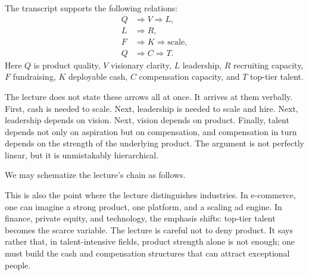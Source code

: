 The transcript supports the following relations:
\begin{align}
Q &\Rightarrow V \Rightarrow L,\\
L &\Rightarrow R,\\
F &\Rightarrow K \Rightarrow \text{scale},\\
Q &\Rightarrow C \Rightarrow T.
\end{align}
Here $Q$ is product quality, $V$ visionary clarity, $L$ leadership, $R$ recruiting capacity, $F$ fundraising, $K$ deployable cash, $C$ compensation capacity, and $T$ top-tier talent.

The lecture does not state these arrows all at once. It arrives at them verbally. First, cash is needed to scale. Next, leadership is needed to scale and hire. Next, leadership depends on vision. Next, vision depends on product. Finally, talent depends not only on aspiration but on compensation, and compensation in turn depends on the strength of the underlying product. The argument is not perfectly linear, but it is unmistakably hierarchical.

We may schematize the lecture's chain as follows.

\begin{figure}
\centering
{}
\end{figure}

This is also the point where the lecture distinguishes industries. In e-commerce, one can imagine a strong product, one platform, and a scaling ad engine. In finance, private equity, and technology, the emphasis shifts: top-tier talent becomes the scarce variable. The lecture is careful not to deny product. It says rather that, in talent-intensive fields, product strength alone is not enough; one must build the cash and compensation structures that can attract exceptional people.

